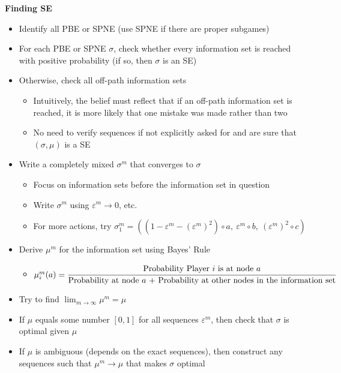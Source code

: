 \documentclass{report}
\newcommand{\FlowerSmall}{\mbox{\raisebox{-1pt}{\small\EightFlowerPetalRemoved}}} %
\begin{document}
\newpage
\begin{mdframed}
	\medskip
	\begin{center} \textbf{{\large Finding SE}} \end{center}
	\begin{itemize}[label=\FlowerSmall]
		\item Identify all PBE or SPNE (use SPNE if there are proper subgames)
		\item For each PBE or SPNE $\sigma$, check whether every information set is reached with positive probability (if so, then $\sigma$ is an SE)
		\item Otherwise, check all off-path information sets
			\begin{itemize}
			\item Intuitively, the belief must reflect that if an off-path information set is reached, it is more likely that one mistake was made rather than two
			\item No need to verify sequences if not explicitly asked for and are sure that $(\sigma,\mu)$ is a SE
			\end{itemize}
		\item Write a completely mixed $\sigma^m$ that converges to $\sigma$
			\begin{itemize}
				\item Focus on information sets before the information set in question
				\item Write $\sigma^m$ using $\varepsilon^m \rightarrow 0$, etc.
				\item For more actions, try $\sigma^m_1 = ((1 - \varepsilon^m - (\varepsilon^m)^2) \circ a, \ \varepsilon^m \circ b, \ (\varepsilon^m)^2 \circ c)$
			\end{itemize}
		\item Derive $\mu^m$ for the information set using Bayes' Rule
			\begin{itemize}
				\item $\mu_i^m(a) = \cfrac{\text{Probability Player $i$ is at node $a$}}{\text{Probability at node $a$ + Probability at other nodes in the information set}}$\\[5pt]
			\end{itemize}
		\item Try to find $\displaystyle\lim_{m \rightarrow \infty} \mu^m = \mu$
		\item If $\mu$ equals some number $[0,1]$ for all sequences $\varepsilon^m$, then check that $\sigma$ is optimal given $\mu$
		\item If $\mu$ is ambiguous (depends on the exact sequences), then construct any sequences such that $\mu^m \rightarrow \mu$ that makes $\sigma$ optimal 	

\end{itemize}
\end{mdframed}
\end{document}
